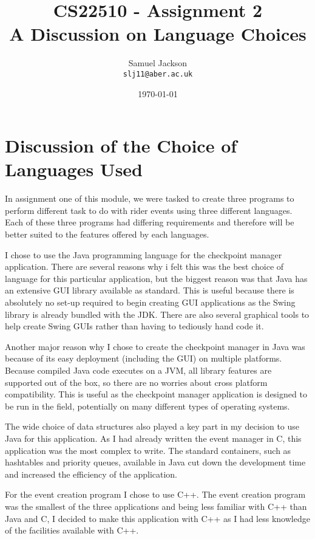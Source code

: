 \documentclass{article}
\begin{document}
\title{CS22510 - Assignment 2 \\ A Discussion on Language Choices}
\author{Samuel Jackson \\ \texttt{slj11@aber.ac.uk}}
\date{\today}
\maketitle

\section{Discussion of the Choice of Languages Used}
In assignment one of this module, we were tasked to create three programs to perform different task to do with rider events using three different languages. Each of these three programs had differing requirements and therefore will be better suited to the features offered by each languages.

I chose to use the Java programming language for the checkpoint manager application. There are several reasons why i felt this was the best choice of language for this particular application, but the biggest reason was that Java has an extensive GUI library available as standard. This is useful because there is absolutely no set-up required to begin creating GUI applications as the Swing library is already bundled with the JDK. There are also several graphical tools to help create Swing GUIs rather than having to tediously hand code it.

Another major reason why I chose to create the checkpoint manager in Java was because of its easy deployment (including the GUI) on multiple platforms. Because compiled Java code executes on a JVM, all library features are supported out of the box, so there are no worries about cross platform compatibility. This is useful as the checkpoint manager application is designed to be run in the field, potentially on many different types of operating systems.

The wide choice of data structures also played a key part in my decision to use Java for this application. As I had already written the event manager in C, this application was the most complex to write. The standard containers, such as hashtables and priority queues, available in Java cut down the development time and increased the efficiency of the application.

For the event creation program I chose to use C++. The event creation program was the smallest of the three applications and being less familiar with C++ than Java and C, I decided to make this application with C++ as I had less knowledge of the facilities available with C++.
\end{document}
